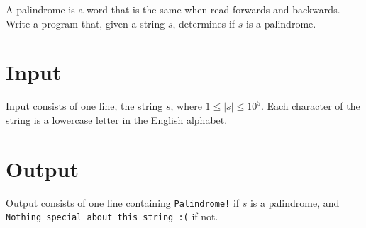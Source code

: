 
A palindrome is a word that is the same when read forwards and backwards. \\
Write a program that, given a string $s$, determines if $s$ is a palindrome.

\section*{Input}
Input consists of one line, the string $s$, where $1 \leq |s| \leq 10^5$.
Each character of the string is a lowercase letter in the English alphabet.

\section*{Output}
Output consists of one line containing \texttt{Palindrome!} if $s$ is a palindrome, and \texttt{Nothing special about this string :(} if not.
